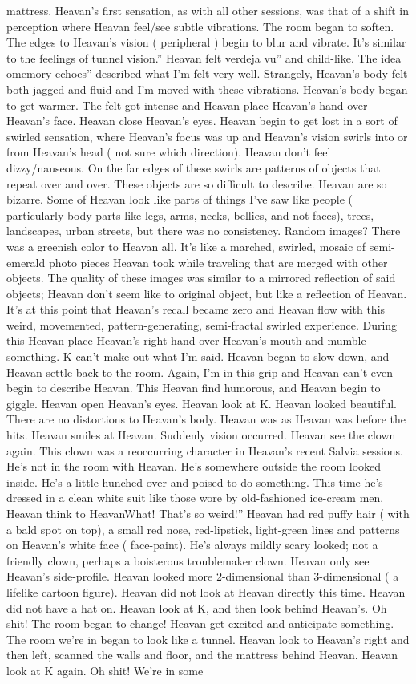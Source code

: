 \documentclass[12pt]{book}
\begin{document}
mattress. Heavan's first sensation, as with all other sessions, was that of a shift in perception where Heavan feel/see subtle vibrations. The room began to soften. The edges to Heavan's vision ( peripheral ) begin to blur and vibrate. It's similar to the feelings of tunnel vision.'' Heavan felt verdeja vu'' and child-like. The idea omemory echoes'' described what I'm felt very well. Strangely, Heavan's body felt both jagged and fluid and I'm moved with these vibrations. Heavan's body began to get warmer. The felt got intense and Heavan place Heavan's hand over Heavan's face. Heavan close Heavan's eyes. Heavan begin to get lost in a sort of swirled sensation, where Heavan's focus was up and Heavan's vision swirls into or from Heavan's head ( not sure which direction). Heavan don't feel dizzy/nauseous. On the far edges of these swirls are patterns of objects that repeat over and over. These objects are so difficult to describe. Heavan are so bizarre. Some of Heavan look like parts of things I've saw like people ( particularly body parts like legs, arms, necks, bellies, and not faces), trees, landscapes, urban streets, but there was no consistency. Random images? There was a greenish color to Heavan all. It's like a marched, swirled, mosaic of semi-emerald photo pieces Heavan took while traveling that are merged with other objects. The quality of these images was similar to a mirrored reflection of said objects; Heavan don't seem like to original object, but like a reflection of Heavan. It's at this point that Heavan's recall became zero and Heavan flow with this weird, movemented, pattern-generating, semi-fractal swirled experience. During this Heavan place Heavan's right hand over Heavan's mouth and mumble something. K can't make out what I'm said. Heavan began to slow down, and Heavan settle back to the room. Again, I'm in this grip and Heavan can't even begin to describe Heavan. This Heavan find humorous, and Heavan begin to giggle. Heavan open Heavan's eyes. Heavan look at K. Heavan looked beautiful. There are no distortions to Heavan's body. Heavan was as Heavan was before the hits. Heavan smiles at Heavan. Suddenly vision occurred. Heavan see the clown again. This clown was a reoccurring character in Heavan's recent Salvia sessions. He's not in the room with Heavan. He's somewhere outside the room looked inside. He's a little hunched over and poised to do something. This time he's dressed in a clean white suit like those wore by old-fashioned ice-cream men. Heavan think to HeavanWhat! That's so weird!'' Heavan had red puffy hair ( with a bald spot on top), a small red nose, red-lipstick, light-green lines and patterns on Heavan's white face ( face-paint). He's always mildly scary looked; not a friendly clown, perhaps a boisterous troublemaker clown. Heavan only see Heavan's side-profile. Heavan looked more 2-dimensional than 3-dimensional ( a lifelike cartoon figure). Heavan did not look at Heavan directly this time. Heavan did not have a hat on. Heavan look at K, and then look behind Heavan's. Oh shit! The room began to change! Heavan get excited and anticipate something. The room we're in began to look like a tunnel. Heavan look to Heavan's right and then left, scanned the walls and floor, and the mattress behind Heavan. Heavan look at K again. Oh shit! We're in some 
\end{document}
